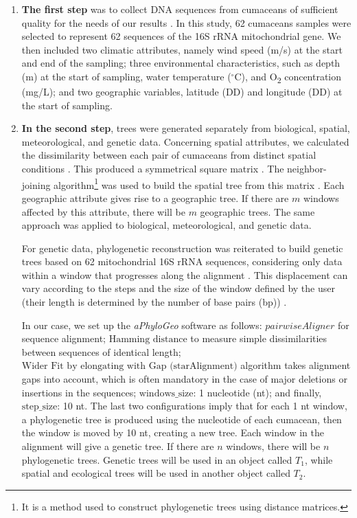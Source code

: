 \begin{enumerate}
\item \textbf{The first step} was to collect DNA sequences from cumaceans of sufficient quality for the needs of our results \citep{koshkarov_phylogeography_2022}. In this study, 62 cumaceans samples were selected to represent 62 sequences of the 16S rRNA mitochondrial gene. We then included two climatic attributes, namely wind speed (m/s) at the start and end of the sampling; three environmental characteristics, such as depth (m) at the start of sampling, water temperature ($^\circ$C), and O\textsubscript{2} concentration (mg/L); and two geographic variables, latitude (DD) and longitude (DD) at the start of sampling.

\item \textbf{In the second step}, trees were generated separately from biological, spatial, meteorological, and genetic data. Concerning spatial attributes, we calculated the dissimilarity between each pair of cumaceans from distinct spatial conditions \citep{koshkarov_phylogeography_2022}. This produced a symmetrical square matrix \citep{koshkarov_phylogeography_2022}. The {neighbor-joining algorithm}\footnote{It is a method used to construct phylogenetic trees using distance matrices.} was used to build the spatial tree from this matrix \citep{koshkarov_phylogeography_2022}. Each geographic attribute gives rise to a geographic tree. If there are $m$ windows affected by this attribute, there will be $m$ geographic trees. The same approach was applied to biological, meteorological, and genetic data. 

For genetic data, phylogenetic reconstruction was reiterated to build genetic trees based on 62 mitochondrial 16S rRNA sequences, considering only data within a window that progresses along the alignment \citep{koshkarov_phylogeography_2022}. This displacement can vary according to the steps and the size of the window defined by the user (their length is determined by the number of base pairs (bp)) \citep{koshkarov_phylogeography_2022}. 

In our case, we set up the \textit{aPhyloGeo} software as follows: $pairwiseAligner$ for sequence alignment; $\text{Hamming distance}$ to measure simple dissimilarities between sequences of identical length; $\text{Wider Fit by elongating with Gap (starAlignment)}$ algorithm takes alignment gaps into account, which is often mandatory in the case of major deletions or insertions in the sequences; $\text{windows\_size}$: 1 nucleotide (nt); and finally, $\text{step\_size}$: 10 nt. The last two configurations imply that for each 1 nt window, a phylogenetic tree is produced using the nucleotide of each cumacean, then the window is moved by 10 nt, creating a new tree. Each window in the alignment will give a genetic tree. If there are $n$ windows, there will be $n$ phylogenetic trees. Genetic trees will be used in an object called $T_1$, while spatial and ecological trees will be used in another object called $T_2$.


\end{enumerate}
